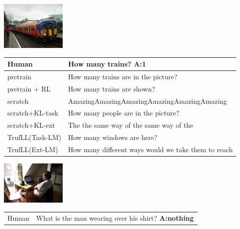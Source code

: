 \documentclass{article}
\newcommand{\algo}{TrufLL\xspace}
\begin{document}
\begin{table}[t!]
    \begin{minipage}{0.2\linewidth}
        \includegraphics[width=120px]{./COCO_val2014_000000034950.jpeg}
	\end{minipage}
	\hspace{1.2cm}
	\begin{minipage}{0.80\linewidth}
		\scriptsize
		\begin{tabular}{ll}
			Human           & How many trains?  \quad \textbf{A:1} \\
			\midrule
			pretrain        & How many trains are in the picture? \\
		    pretrain + RL   & How many trains are shown? \\ \midrule
			scratch         & AmazingAmazingAmazingAmazingAmazingAmazing  \\
			scratch+KL-task & How many people are in the picture? \\
			scratch+KL-ext  & The the same way of the same way of the\\ \midrule
			\algo(Task-LM) & How many windows are here? \\
			\algo(Ext-LM)   & How many different ways would we take them to reach \\
			\bottomrule
		\end{tabular}
	\end{minipage}
	\vspace{1mm}
\begin{minipage}{0.2\linewidth}
		\centering
        \includegraphics[width=120px]{./COCO_val2014_000000034993.jpg}
	\end{minipage}
	\hspace{1.2cm}
	\begin{minipage}{0.85\linewidth}
	\small
		\scriptsize
		\begin{tabular}{ll}
			\toprule
			Human            & What is the man wearing over his shirt?  \quad \textbf{A:nothing} \\

\end{tabular}
\end{minipage}
\end{table}
\end{document}
